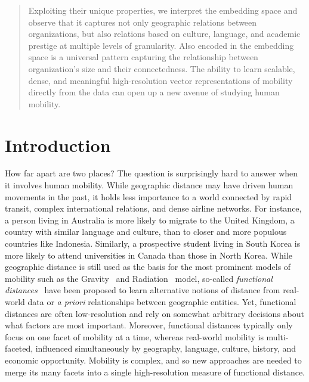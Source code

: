 \documentclass[12pt]{article} %
\begin{document}
\begin{abstract}
Exploiting their unique properties, we interpret the embedding space and observe that it captures not only geographic relations between organizations, but also relations based on culture, language, and academic prestige at multiple levels of granularity.
Also encoded in the embedding space is a universal pattern capturing the relationship between organization's size and their connectedness.
The ability to learn scalable, dense, and meaningful high-resolution vector representations of mobility directly from the data can open up a new avenue of studying human mobility.

\end{abstract}



%
%
\section{Introduction}\label{sec:introduction} %


How far apart are two places?
The question is surprisingly hard to answer when it involves human mobility.
While geographic distance may have driven human movements in the past, it holds less importance to a world connected by rapid transit, complex international relations, and dense airline networks.
For instance, a person living in Australia is more likely to migrate to the United Kingdom, a country with similar language and culture, than to closer and more populous countries like Indonesia. 
Similarly, a prospective student living in South Korea is more likely to attend universities in Canada than those in North Korea. 
While geographic distance is still used as the basis for the most prominent models of mobility such as the Gravity~\autocite{zipf1946gravity} and Radiation~\autocite{simini2012universal} model, so-called \textit{functional distances}~\autocite{boschma2005proximity, brown1970functional, brown1970migration, kim2018functional} have been proposed to learn alternative notions of distance from real-world data or \textit{a priori} relationships between geographic entities. 
Yet, functional distances are often low-resolution and rely on somewhat arbitrary decisions about what factors are most important.
Moreover, functional distances typically only focus on one facet of mobility at a time, whereas real-world mobility is multi-faceted, influenced simultaneously by geography, language, culture, history, and economic opportunity. 
Mobility is complex, and so new approaches are needed to merge its many facets into a single high-resolution measure of functional distance.
\end{document}
